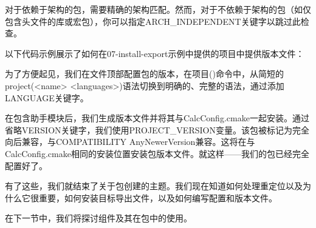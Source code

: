 对于依赖于架构的包，需要精确的架构匹配。然而，对于不依赖于架构的包（如仅包含头文件的库或宏包），你可以指定ARCH\_INDEPENDENT关键字以跳过此检查。

以下代码示例展示了如何在07-install-export示例中提供的项目中提供版本文件：



为了方便起见，我们在文件顶部配置包的版本，在项目()命令中，从简短的project(<name> <languages>)语法切换到明确的、完整的语法，通过添加LANGUAGE关键字。

在包含助手模块后，我们生成版本文件并将其与CalcConfig.cmake一起安装。通过省略VERSION关键字，我们使用PROJECT\_VERSION变量。该包被标记为完全向后兼容，与COMPATIBILITY AnyNewerVersion兼容。这将在与CalcConfig.cmake相同的安装位置安装包版本文件。就这样——我们的包已经完全配置好了。

有了这些，我们就结束了关于包创建的主题。我们现在知道如何处理重定位以及为什么它很重要，如何安装目标导出文件，以及如何编写配置和版本文件。

在下一节中，我们将探讨组件及其在包中的使用。































